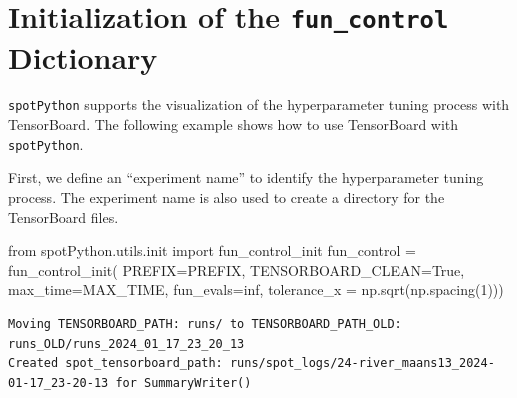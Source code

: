 \documentclass[
  letterpaper,
  DIV=11,
  numbers=noendperiod]{scrreprt}
\newenvironment{Shaded}{\begin{snugshade}}{\end{snugshade}}
\newcommand{\DecValTok}[1]{\textcolor[rgb]{0.68,0.00,0.00}{#1}}
\newcommand{\ImportTok}[1]{\textcolor[rgb]{0.00,0.46,0.62}{#1}}
\newcommand{\NormalTok}[1]{\textcolor[rgb]{0.00,0.23,0.31}{#1}}
\newcommand{\OperatorTok}[1]{\textcolor[rgb]{0.37,0.37,0.37}{#1}}
\newcommand{\VariableTok}[1]{\textcolor[rgb]{0.07,0.07,0.07}{#1}}
\begin{document}
\section{\texorpdfstring{Initialization of the \texttt{fun\_control}
Dictionary}{Initialization of the fun\_control Dictionary}}\label{initialization-of-the-fun_control-dictionary}

\texttt{spotPython} supports the visualization of the hyperparameter
tuning process with TensorBoard. The following example shows how to use
TensorBoard with \texttt{spotPython}.

First, we define an ``experiment name'' to identify the hyperparameter
tuning process. The experiment name is also used to create a directory
for the TensorBoard files.

\begin{Shaded}
\begin{Highlighting}[]
\ImportTok{from}\NormalTok{ spotPython.utils.init }\ImportTok{import}\NormalTok{ fun\_control\_init}
\NormalTok{fun\_control }\OperatorTok{=}\NormalTok{ fun\_control\_init(}
\NormalTok{    PREFIX}\OperatorTok{=}\NormalTok{PREFIX,}
\NormalTok{    TENSORBOARD\_CLEAN}\OperatorTok{=}\VariableTok{True}\NormalTok{,}
\NormalTok{    max\_time}\OperatorTok{=}\NormalTok{MAX\_TIME,}
\NormalTok{    fun\_evals}\OperatorTok{=}\NormalTok{inf,}
\NormalTok{    tolerance\_x }\OperatorTok{=}\NormalTok{ np.sqrt(np.spacing(}\DecValTok{1}\NormalTok{)))}
\end{Highlighting}
\end{Shaded}

\begin{verbatim}
Moving TENSORBOARD_PATH: runs/ to TENSORBOARD_PATH_OLD: runs_OLD/runs_2024_01_17_23_20_13
Created spot_tensorboard_path: runs/spot_logs/24-river_maans13_2024-01-17_23-20-13 for SummaryWriter()
\end{verbatim}
\end{document}
